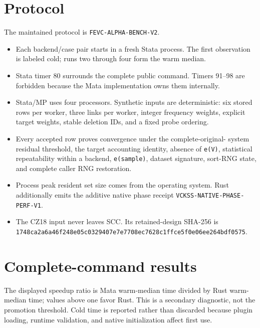 \documentclass[11pt]{article}
\begin{document}
\section{Protocol}

The maintained protocol is \texttt{FEVC-ALPHA-BENCH-V2}.

\begin{itemize}
  \item Each backend/case pair starts in a fresh Stata process.  The first
  observation is labeled cold; runs two through four form the warm median.
  \item Stata timer 80 surrounds the complete public command.  Timers 91--98
  are forbidden because the Mata implementation owns them internally.
  \item Stata/MP uses four processors.  Synthetic inputs are deterministic:
  six stored rows per worker, three links per worker, integer frequency
  weights, explicit target weights, stable deletion IDs, and a fixed probe
  ordering.
  \item Every accepted row proves convergence under the complete-original-
  system residual threshold, the target accounting identity, absence of
  \texttt{e(V)}, statistical repeatability within a backend, \texttt{e(sample)},
  dataset signature, sort-RNG state, and complete caller RNG restoration.
  \item Process peak resident set size comes from the operating system.  Rust
  additionally emits the additive native phase receipt
  \texttt{VCKSS-NATIVE-PHASE-PERF-V1}.
  \item The CZ18 input never leaves SCC.  Its retained-design SHA-256 is
  \texttt{1748ca2a6a46f248e05c0329407e7e7708ec7628c1ffce5f0e06ee264bdf0575}.
\end{itemize}

\section{Complete-command results}

\begin{center}
\small

\end{center}

\begin{center}

\end{center}

The displayed speedup ratio is Mata warm-median time divided by Rust warm-
median time; values above one favor Rust.  This is a secondary diagnostic, not
the promotion threshold.  Cold time is reported rather than discarded because
plugin loading, runtime validation, and native initialization affect first use.
\end{document}

